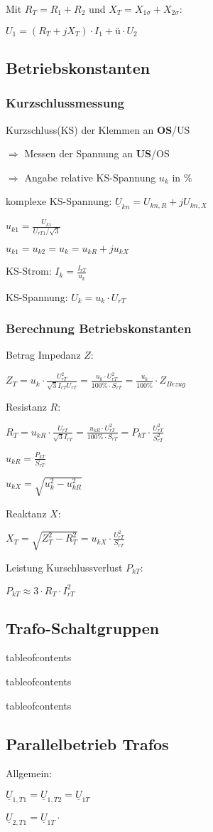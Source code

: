 \documentclass[a4paper,11pt]{article}
\begin{document}
	Mit $R_T = R_1 + R_2$ und $X_T = X_{1\sigma} + X_{2\sigma}$:
	
	$U_1 = (R_T + jX_T) \cdot I_1 + \text{ü} \cdot U_2$

	\subsection{Betriebskonstanten}
	\subsubsection{Kurzschlussmessung}

	Kurzschluss(KS) der Klemmen an  \textbf{OS}/US
	
	$\Rightarrow$ Messen der Spannung an \textbf{US}/OS 
	
	$\Rightarrow$ Angabe relative KS-Spannung $u_{k}$ in $\%$

	komplexe KS-Spannung: $\underline{U}_{kn} = U_{kn,R} +jU_{kn,X}$

	$u_{k1} = \frac{U_{k1}}{U_{rT1}/ \sqrt{3}}$

	$u_{k1} = u_{k2} = u_{k} = u_{kR}+j u_{kX}$

	KS-Strom:
	$I_k = \frac{I_{rT}}{u_k}$

	KS-Spannung:
	$U_k = u_k \cdot U_{rT}$
	\subsubsection{Berechnung Betriebskonstanten}
	
	Betrag Impedanz $Z$:
	
	$Z_T = u_k \cdot \frac{U_{rT}^2}{\sqrt{3}I_{rT}U_{rT}} =\frac{u_k \cdot U_{rT}^2}{100 \% \cdot S_{rT}} = \frac{u_k}{100\%} \cdot Z_{Bezug}$

	Resistanz $R$:
	
	$R_T = u_{kR} \cdot \frac{U_{rT}}{\sqrt{3} I_{rT}} = \frac{u_{kR}\cdot U^2_{rT}}{100\% \cdot S_{rT}} = P_{kT} \cdot \frac{U_{rT}^2}{S_{rT}^2}$

	$u_{kR} = \frac{P_{kT}}{S_{rT}}$

	$u_{kX} = \sqrt{u^2_k - u^2_{kR}}$
	
	Reaktanz $X$:
	
	$X_T = \sqrt{Z^2_T - R^2_T} = u_{kX} \cdot \frac{U^2_{rT}}{S_{rT}}$
	
	Leistung Kurschlussverlust $P_{kT}$:
	
	$P_{kT} \approx 3\cdot R_T \cdot I^2_{rT}$
	
	\subsection{Trafo-Schaltgruppen}
	tableofcontents

	
	tableofcontents
	
	
	tableofcontents

	\subsection{Parallelbetrieb Trafos}
	Allgemein:

	$\underline{U}_{1,T1} = \underline{U}_{1,T2} = \underline{U}_{1T}$

	$\underline{U}_{2,T1} = \underline{U}_{1T} \cdot $

	



	
\end{document}
